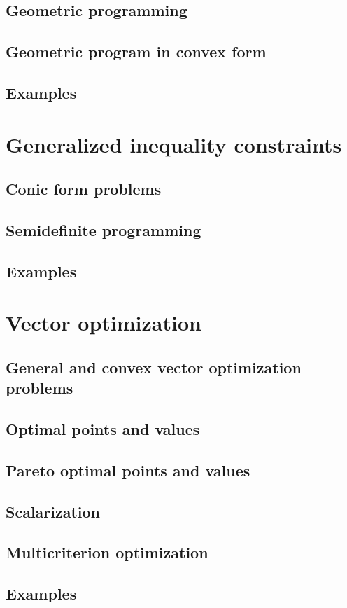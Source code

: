 \subsection{Geometric programming}

\subsection{Geometric program in convex form}

\subsection{Examples}

\section{Generalized inequality constraints}

\subsection{Conic form problems}

\subsection{Semidefinite programming}

\subsection{Examples}

\section{Vector optimization}

\subsection{General and convex vector optimization problems}
\begin{example}
\end{example}

\subsection{Optimal points and values}

\subsection{Pareto optimal points and values}

\subsection{Scalarization}
\begin{example}
\end{example}

\subsection{Multicriterion optimization}

\subsection{Examples}
